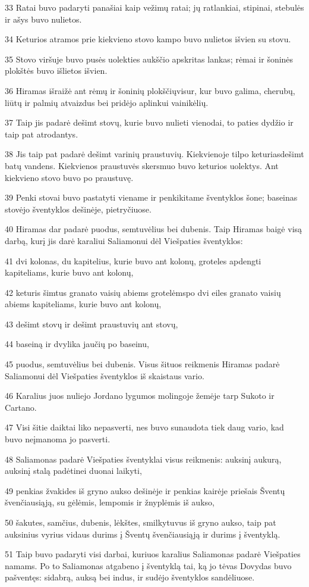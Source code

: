 \par 33 Ratai buvo padaryti panašiai kaip vežimų ratai; jų ratlankiai, stipinai, stebulės ir ašys buvo nulietos. 
\par 34 Keturios atramos prie kiekvieno stovo kampo buvo nulietos išvien su stovu. 
\par 35 Stovo viršuje buvo pusės uolekties aukščio apskritas lankas; rėmai ir šoninės plokštės buvo išlietos išvien. 
\par 36 Hiramas išraižė ant rėmų ir šoninių plokščių­visur, kur buvo galima, cherubų, liūtų ir palmių atvaizdus bei pridėjo aplinkui vainikėlių. 
\par 37 Taip jis padarė dešimt stovų, kurie buvo nulieti vienodai, to paties dydžio ir taip pat atrodantys. 
\par 38 Jis taip pat padarė dešimt varinių praustuvių. Kiekvienoje tilpo keturiasdešimt batų vandens. Kiekvienos praustuvės skersmuo buvo keturios uolektys. Ant kiekvieno stovo buvo po praustuvę. 
\par 39 Penki stovai buvo pastatyti viename ir penki­kitame šventyklos šone; baseinas stovėjo šventyklos dešinėje, pietryčiuose. 
\par 40 Hiramas dar padarė puodus, semtuvėlius bei dubenis. Taip Hiramas baigė visą darbą, kurį jis darė karaliui Saliamonui dėl Viešpaties šventyklos: 
\par 41 dvi kolonas, du kapitelius, kurie buvo ant kolonų, groteles apdengti kapiteliams, kurie buvo ant kolonų, 
\par 42 keturis šimtus granato vaisių abiems grotelėms­po dvi eiles granato vaisių abiems kapiteliams, kurie buvo ant kolonų, 
\par 43 dešimt stovų ir dešimt praustuvių ant stovų, 
\par 44 baseiną ir dvylika jaučių po baseinu, 
\par 45 puodus, semtuvėlius bei dubenis. Visus šituos reikmenis Hiramas padarė Saliamonui dėl Viešpaties šventyklos iš skaistaus vario. 
\par 46 Karalius juos nuliejo Jordano lygumos molingoje žemėje tarp Sukoto ir Cartano. 
\par 47 Visi šitie daiktai liko nepasverti, nes buvo sunaudota tiek daug vario, kad buvo neįmanoma jo pasverti. 
\par 48 Saliamonas padarė Viešpaties šventyklai visus reikmenis: auksinį aukurą, auksinį stalą padėtinei duonai laikyti, 
\par 49 penkias žvakides iš gryno aukso dešinėje ir penkias kairėje priešais Šventų švenčiausiąją, su gėlėmis, lempomis ir žnyplėmis iš aukso, 
\par 50 šakutes, samčius, dubenis, lėkštes, smilkytuvus iš gryno aukso, taip pat auksinius vyrius vidaus durims į Šventų švenčiausiąją ir durims į šventyklą. 
\par 51 Taip buvo padaryti visi darbai, kuriuos karalius Saliamonas padarė Viešpaties namams. Po to Saliamonas atgabeno į šventyklą tai, ką jo tėvas Dovydas buvo pašventęs: sidabrą, auksą bei indus, ir sudėjo šventyklos sandėliuose.



